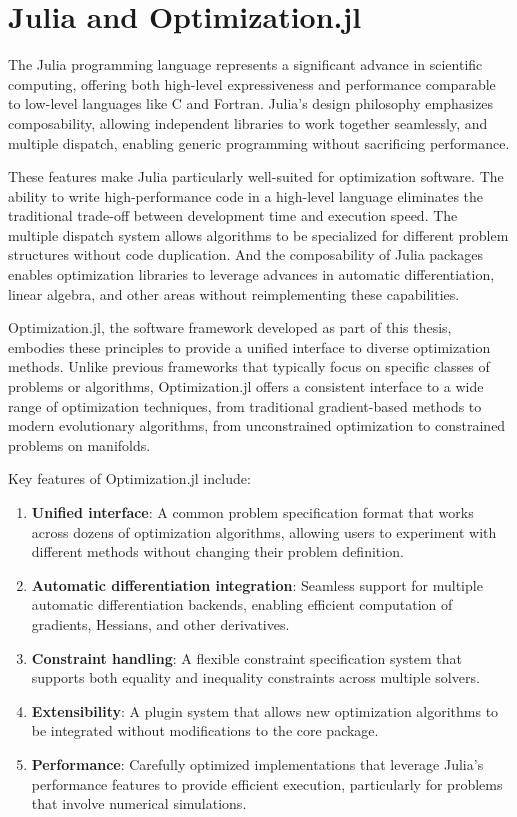 \section{Julia and Optimization.jl}

The Julia programming language represents a significant advance in scientific computing, offering both high-level expressiveness and performance comparable to low-level languages like C and Fortran. Julia's design philosophy emphasizes composability, allowing independent libraries to work together seamlessly, and multiple dispatch, enabling generic programming without sacrificing performance.

These features make Julia particularly well-suited for optimization software. The ability to write high-performance code in a high-level language eliminates the traditional trade-off between development time and execution speed. The multiple dispatch system allows algorithms to be specialized for different problem structures without code duplication. And the composability of Julia packages enables optimization libraries to leverage advances in automatic differentiation, linear algebra, and other areas without reimplementing these capabilities.

Optimization.jl, the software framework developed as part of this thesis, embodies these principles to provide a unified interface to diverse optimization methods. Unlike previous frameworks that typically focus on specific classes of problems or algorithms, Optimization.jl offers a consistent interface to a wide range of optimization techniques, from traditional gradient-based methods to modern evolutionary algorithms, from unconstrained optimization to constrained problems on manifolds.

Key features of Optimization.jl include:

\begin{enumerate}
\item \textbf{Unified interface}: A common problem specification format that works across dozens of optimization algorithms, allowing users to experiment with different methods without changing their problem definition.

\item \textbf{Automatic differentiation integration}: Seamless support for multiple automatic differentiation backends, enabling efficient computation of gradients, Hessians, and other derivatives.

\item \textbf{Constraint handling}: A flexible constraint specification system that supports both equality and inequality constraints across multiple solvers.

\item \textbf{Extensibility}: A plugin system that allows new optimization algorithms to be integrated without modifications to the core package.

\item \textbf{Performance}: Carefully optimized implementations that leverage Julia's performance features to provide efficient execution, particularly for problems that involve numerical simulations.
\end{enumerate}

